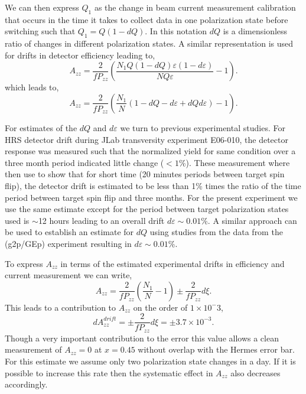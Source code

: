 We can then express $Q_1$ as the change in beam current measurement calibration that occurs in
the time it takes to collect data in one polarization state before switching such that $Q_1=Q(1-dQ)$.
In this notation $dQ$ is a dimensionless ratio of changes in different polarization states.  A similar representation
is used for drifts in detector efficiency leading to,
\begin{equation}
A_{zz}=\frac{2}{fP_{zz}}\left(\frac{N_1Q(1-dQ)\varepsilon(1-d\varepsilon)}{NQ\varepsilon}-1\right).
\end{equation}
which leads to,
\begin{equation}
A_{zz}=\frac{2}{fP_{zz}}\left(\frac{N_1}{N}(1-dQ-d\varepsilon+dQd\varepsilon)-1\right).
\end{equation}

For estimates of the $dQ$ and $d\varepsilon$ we turn to previous experimental
studies.  For HRS detector drift during JLab transversity experiment E06-010, the detector response
was measured such that the normalized yield for same condition over a three month period indicated little change ($<1$\%).
These measurement where then use to show that for short time (20 minutes periods between target spin flip),
the detector drift is estimated to be less than 1\% times the ratio of the time period between target spin flip and three months.
For the present experiment we use the same estimate except for the period between target polarization states used is
$\sim$12 hours leading to an overall drift $d\varepsilon\sim0.01\%$.  A similar approach can be used to establish an estimate
for $dQ$ using studies from the data from the (g2p/GEp) experiment resulting in $d\varepsilon\sim0.01\%$.

To express $A_{zz}$ in terms of the estimated experimental drifts in efficiency and current measurement we can write,
\begin{equation}
A_{zz}=\frac{2}{fP_{zz}}\left(\frac{N_1}{N}-1\right)\pm\frac{2}{fP_{zz}}d\xi.
\end{equation}
This leads to a contribution to $A_{zz}$ on the order of $1\times10^-3$,
\begin{equation}
dA_{zz}^{drift}=\pm\frac{2}{fP_{zz}}d\xi=\pm3.7\times10^{-3}.
\end{equation}
Though a very important contribution to the error this value allows a clean measurement of $A_{zz}=0$ at $x=0.45$
without overlap with the Hermes error bar.  For this estimate we assume only two polarization state changes in a
day.  If it is possible to increase this rate then the systematic effect in $A_{zz}$ also decreases accordingly.

